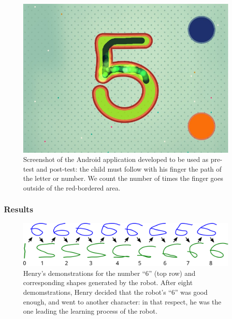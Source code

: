 \documentclass{article}
\begin{document}
\begin{figure}
    \centering
    \includegraphics[width=0.9\linewidth]{abc-writer}
    \caption{Screenshot of the Android application developed to be used as
    pre-test and post-test: the child must follow with his finger the path of
the letter or number. We count the number of times the finger goes outside of
the red-bordered area.}
    \label{}
\end{figure}


\subsubsection{Results}

\begin{figure}
    \centering
    \includegraphics[width=0.9\linewidth]{learning_6_demos}
    \caption{Henry's demonstrations for the number ``6'' (top row) and
        corresponding shapes generated by the robot. After eight demomstrations,
        Henry decided that the robot's ``6'' was good enough, and went to
    another character: in that respect, he was the one leading the learning
process of the robot.}
    \label{henry_demos}
\end{figure}
\end{document}
